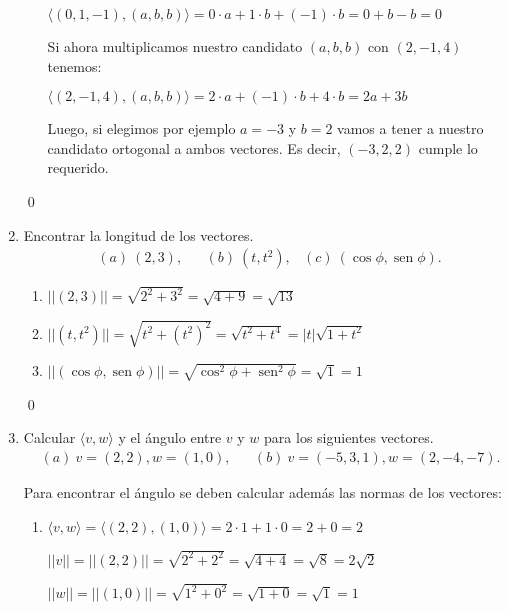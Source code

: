 \begin{enumerate}[topsep=6pt, itemsep=.4cm]
\begin{enumerate}
$\langle (0,1,-1),(a,b,b)\rangle = 0 \cdot a + 1 \cdot b + (-1) \cdot b = 0 + b - b = \boxed{0}$

Si ahora multiplicamos nuestro candidato $(a,b,b)$ con $(2,-1,4)$ tenemos:

$\langle (2,-1,4) , (a,b,b) \rangle = 2 \cdot a + (-1) \cdot b + 4 \cdot b = \boxed{2a + 3 b}$

Luego, si elegimos por ejemplo $a=-3$ y $b=2$ vamos a tener a nuestro candidato ortogonal a ambos vectores. Es decir, $(-3,2,2)$ cumple lo requerido.
\end{enumerate}

\qed

\item Encontrar la longitud de los vectores.
\begin{align*}
&(a) \ (2,3), && (b) \ (t,t^2), & (c) \ (\cos\phi,\operatorname{sen}\phi).
\end{align*}

\rta 

\begin{enumerate}
\item $||(2,3)|| = \sqrt{2^2 + 3^2} = \sqrt{4+9} = \boxed{\sqrt{13}}$

\item $||(t,t^2)|| = \sqrt{t^2 + (t^2)^2} = \sqrt{t^2+t^4} = \boxed{|t|\sqrt{1+t^2}}$

\item $||(\cos\phi,\operatorname{sen}\phi)|| = \sqrt{\cos^2\phi + \operatorname{sen}^2\phi} = \sqrt{1} = \boxed{1}$
\end{enumerate}

\qed

\item Calcular $\langle v , w  \rangle$ y el ángulo entre $v$ y $w$  para los siguientes vectores.
\begin{align*}
&(a) \ v=(2,2), w=(1,0), &&  (b) \  v=(-5,3,1), w=(2,-4,-7).
\end{align*}

\rta Para encontrar el ángulo se deben calcular además las normas de los vectores:

\begin{enumerate}
\item $\langle v , w  \rangle = \langle (2,2) , (1,0)  \rangle = 2 \cdot 1 + 1 \cdot 0 = 2 + 0 = \boxed{2}$

$||v||=||(2,2)|| = \sqrt{2^2 + 2^2} = \sqrt{4+4} = \sqrt{8} = 2 \sqrt{2}$

$||w||=||(1,0)|| = \sqrt{1^2 + 0 ^2} = \sqrt{1+0} = \sqrt{1} = 1 $


\end{enumerate}
\end{enumerate}
